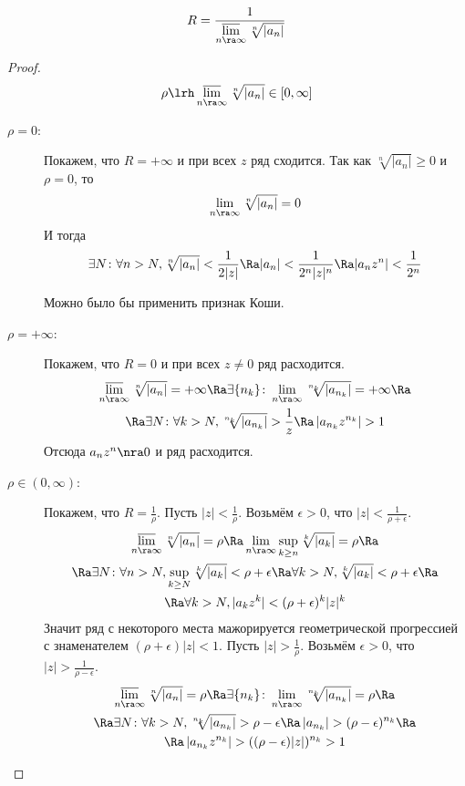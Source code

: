 \begin{theorem}
	\[ R = \frac1{\varlimsup\limits_{n \ra \infty} \sqrt[n]{|a_n|}} \]
\end{theorem}
\begin{proof}
	\[ \rho \lrh \varlimsup\limits_{n \ra \infty} \sqrt[n]{|a_n|} \in [0, \infty] \]
	\begin{description}
	\item[$\rho = 0$:]
		Покажем, что $R = +\infty$ и при всех $z$ ряд сходится.
		Так как $\sqrt[n]{|a_n|} \ge 0$ и $\rho = 0$, то
		\[ \lim_{n \ra \infty} \sqrt[n]{|a_n|} = 0 \]
		И тогда
		\[ \exists N\colon \forall n > N, \sqrt[n]{|a_n|} < \frac1{2|z|} \Ra |a_n| < \frac1{2^n|z|^n} \Ra |a_nz^n| < \frac1{2^n} \]
		\begin{Rem}
			Можно было бы применить признак Коши.
		\end{Rem}

	\item[$\rho = +\infty$:]
		Покажем, что $R = 0$ и при всех $z \ne 0$ ряд расходится.
		\begin{gather*}
			\varlimsup\limits_{n \ra \infty} \sqrt[n]{|a_n|} = +\infty
			\Ra \exists \{n_k\}\colon \lim_{n \ra \infty} \sqrt[n_k]{\left|a_{n_k}\right|} = +\infty \Ra \\
			\Ra \exists N\colon \forall k > N, \sqrt[n_k]{\left|a_{n_k}\right|} > \frac1z \Ra \left|a_{n_k} z^{n_k}\right| > 1
		\end{gather*}
		Отсюда $a_n z^n \nra 0$ и ряд расходится.

	\item[$\rho \in (0, \infty)$:]
		Покажем, что $R = \frac1\rho$.
		Пусть $|z| < \frac1\rho$.
		Возьмём $\epsilon > 0$, что $|z| < \frac1{\rho + \epsilon}$.
		\begin{gather*}
			\varlimsup\limits_{n \ra \infty} \sqrt[n]{|a_n|} = \rho
			\Ra \lim_{n \ra \infty} \sup_{k \ge n} \sqrt[k]{|a_k|} = \rho \Ra \\
			\Ra \exists N\colon \forall n > N, \sup_{k \ge N} \sqrt[k]{|a_k|} < \rho + \epsilon
			\Ra \forall k > N, \sqrt[k]{|a_k|} < \rho + \epsilon \Ra \\
			\Ra \forall k > N, |a_k z^k| < (\rho + \epsilon)^k |z|^k
		\end{gather*}
		Значит ряд с некоторого места мажорируется геометрической прогрессией с знаменателем $(\rho+\epsilon)|z| < 1$.
		Пусть $|z| > \frac1\rho$.
		Возьмём $\epsilon > 0$, что $|z| > \frac1{\rho - \epsilon}$.
		\begin{gather*}
			\varlimsup\limits_{n \ra \infty} \sqrt[n]{|a_n|} = \rho
			\Ra \exists \{n_k\}\colon \lim_{n \ra \infty} \sqrt[n_k]{\left|a_{n_k}\right|} = \rho \Ra \\
			\Ra \exists N\colon \forall k > N, \sqrt[n_k]{\left|a_{n_k}\right|} > \rho - \epsilon
			\Ra \left|a_{n_k}\right| > (\rho - \epsilon)^{n_k} \Ra \\
			\Ra \left|a_{n_k} z^{n_k}\right| > ((\rho - \epsilon)|z|)^{n_k} > 1
		\end{gather*}
	\end{description}
\end{proof}
